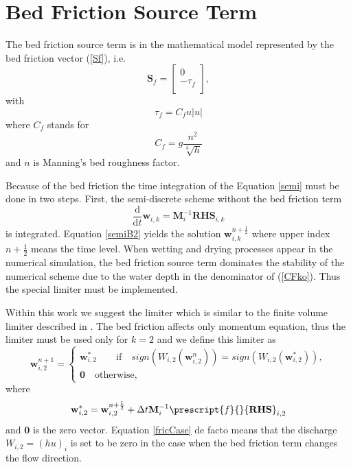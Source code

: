\section{Bed Friction Source Term}\label{friction}
The bed friction source term is in the mathematical model represented by the bed friction vector (\ref{Sf}), i.e.
\begin{equation}\nonumber
\mathbf{S}_{f}=\begin{bmatrix}                                                  
0 \\                                                                            
-\tau_f\\                                                    
\end{bmatrix},
\end{equation}
with 
\begin{equation}
\tau_f = C_f u |u|
\end{equation}
where $C_f$ stands for 
\begin{equation}\label{CFko}
C_f=g \frac{n^2}{\sqrt[3]{h}}
\end{equation}
and $n$ is Manning's bed roughness factor.

Because of the bed friction the time integration of the Equation \ref{semi} must be done in two steps. First, the semi-discrete scheme without the bed friction term
\begin{equation}\label{semiB2}
\frac{\text{d}}{\text{d}t}\mathbf{w}_{i,k}= \mathbf{M}_i^{-1}\mathbf{RHS}_{i,k}
\end{equation}
is integrated. Equation \ref{semiB2} yields the solution $\mathbf{w}^{n+\frac12}_{i,k}$ where upper index $n+\frac12$ means the time level. When wetting and drying processes appear in the numerical simulation, the bed friction source term dominates the stability of the numerical scheme due to the water depth in the denominator of (\ref{CFko}). Thus the special limiter must be implemented.

 Within this work we suggest the limiter which is similar to the finite volume limiter described in \cite{marche}. The bed friction affects only momentum equation, thus the limiter must be used only for $k=2$ and we define this limiter as
  \begin{equation}\label{fricCase}
\mathbf{w}_{i,2}^{n+1}=
\begin{cases}
                \mathbf{w}_{i,2}^{*}   \quad  \quad  \text{if} \quad sign\left(W_{i,2}\left(\mathbf{w}^{n}_{i,2}\right)\right)=
sign\left(W_{i,2}\left(\mathbf{w}_{i,2}^{*}\right)\right) ,\\
                \mathbf{0} \quad \text{otherwise,}
\end{cases}
\end{equation}
where
\begin{equation}
\mathbf{w}_{i,2}^{*}=\mathbf{w}_{i,2}^{n+\frac12}+\Delta t \mathbf{M}_i^{-1}
 \prescript{f}{}{\mathbf{RHS}}_{i,2}
\end{equation}
and $\mathbf{0}$ is the zero vector. Equation \ref{fricCase} de facto means that the discharge $W_{i,2}=(hu)_i$ is set to be zero in the case when the bed friction term changes the flow direction.

